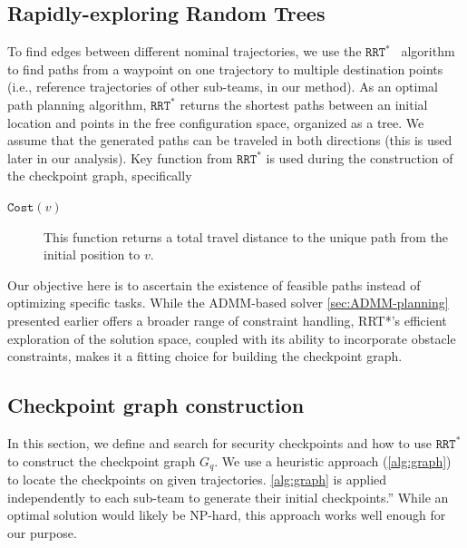 \documentclass[10pt,twocolumn,twoside]{IEEEtran}
\newcommand{\rrtstar}{$\texttt{RRT}^\texttt{*}$}
\begin{document}
\subsection{Rapidly-exploring Random Trees}
To find edges between different nominal trajectories, we use the \rrtstar{}~\cite{karaman2010incremental} algorithm to find paths from a waypoint on one trajectory to multiple destination points (i.e., reference trajectories of other sub-teams, in our method). As an optimal path planning algorithm, \rrtstar{} returns the shortest paths between an initial location and points in the free configuration space, organized as a tree. We assume that the generated paths can be traveled in both directions (this is used later in our analysis). 
Key function from \rrtstar{} is used during the construction of the checkpoint graph, specifically
\begin{description}
\item[$\texttt{Cost}(v)$] This function returns a total travel distance to the unique path from the initial position to $v$. 
\end{description}

Our objective here is to ascertain the existence of feasible paths instead of optimizing specific tasks. While the ADMM-based solver \cref{sec:ADMM-planning} presented earlier offers a broader range of constraint handling, RRT*'s efficient exploration of the solution space, coupled with its ability to incorporate obstacle constraints, makes it a fitting choice for building the checkpoint graph.

\subsection{Checkpoint graph construction}\label{sec:security-checkpoint}

In this section, we define and search for security checkpoints and how to use \rrtstar{} to construct the checkpoint graph $G_{q}$. We use a heuristic approach (\cref{alg:graph}) to locate the checkpoints on given trajectories. \cref{alg:graph} is applied independently to each sub-team to generate their initial checkpoints.” While an optimal solution would likely be NP-hard, this approach works well enough for our purpose.
\end{document}
